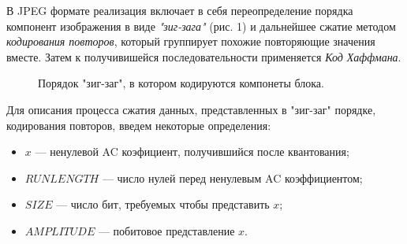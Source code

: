 \documentclass{matmex-diploma-custom}
\begin{document}
 В JPEG формате реализация включает в себя переопределение порядка компонент изображения в виде \emph{"зиг-зага"} (рис. 1) и дальнейшее сжатие методом \emph{кодирования повторов}, который группирует похожие повторяющие значения вместе. Затем к получивишейся последовательности применяется \emph{Код Хаффмана}.\\
    \begin{figure}
      \centering
      \caption{Порядок "зиг-заг", в котором кодируются компонеты блока.}
    \end{figure}


Для описания процесса сжатия  данных, представленных в "зиг-заг" порядке, кодирования повторов, введем некоторые определения:


\begin{itemize}
    \item{
        $x$ --- ненулевой AC коэфициент, получившийся после квантования;
    }
    \item{
        $RUNLENGTH$ --- число нулей перед ненулевым AC коэффициентом;
    }
     \item{
        $SIZE$ --- число бит, требуемых чтобы представить $x$;
     }
    \item{
        $AMPLITUDE$ --- побитовое представление $x$.
    }
\end{itemize}
\end{document}
